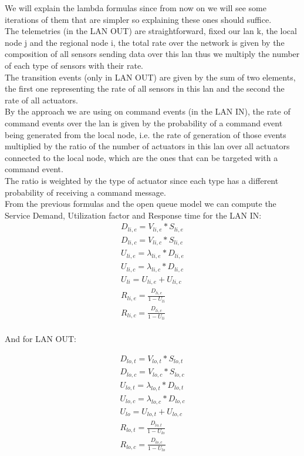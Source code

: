 \documentclass[11pt]{article}
\begin{document}
We will explain the lambda formulas since from now on we will see some iterations of them that are simpler so explaining these ones should suffice.\\
The telemetries (in the LAN OUT) are straightforward, fixed our lan k, the local node j and the regional node i, the total rate over the network is given by the composition of all sensors sending data over this lan thus we multiply the number of each type of sensors with their rate.\\
The transition events (only in LAN OUT) are given by the sum of two elements, the first one representing the rate of all sensors in this lan and the second the rate of all actuators.\\
By the approach we are using on command events (in the LAN IN), the rate of command events over the lan is given by the probability of a command event being generated from the local node, i.e. the rate of generation of those events multiplied by the ratio of the number of actuators in this lan over all actuators connected to the local node, which are the ones that can be targeted with a command event.\\
The ratio is weighted by the type of actuator since each type has a different probability of receiving a command message.\\

From the previous formulas and the open queue model we can compute the Service Demand, Utilization factor and Response time for the LAN IN:
\begin{equation}
    \begin{array}{l}
        D_{li, e} = V_{li, e} * S_{li, e} \\
        D_{li, c} = V_{li, c} * S_{li, c} \\
        U_{li, e} = \lambda_{li, e} * D_{li, e} \\
        U_{li, c} = \lambda_{li, c} * D_{li, c} \\
        U_{li} = U_{li, e} + U_{li, c} \\
        R_{li, e} = \frac{D_{li, e}}{1 - U_{li}} \\
        R_{li, c} = \frac{D_{li, c}}{1 - U_{li}} \\
    \end{array}
\end{equation}

And for LAN OUT:

\begin{equation}
    \begin{array}{l}
        D_{lo, t} = V_{lo, t} * S_{lo, t} \\
        D_{lo, c} = V_{lo, c} * S_{lo, c} \\
        U_{lo, t} = \lambda_{lo, t} * D_{lo, t} \\
        U_{lo, c} = \lambda_{lo, c} * D_{lo, c} \\
        U_{lo} = U_{lo, t} + U_{lo, c} \\
        R_{lo, t} = \frac{D_{lo, t}}{1 - U_{lo}} \\
        R_{lo, c} = \frac{D_{lo, c}}{1 - U_{lo}} \\
    \end{array}
\end{equation}
\end{document}
